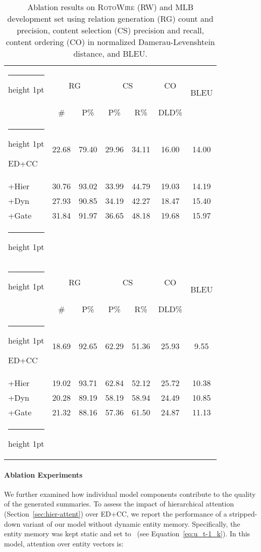 \documentclass[11pt,a4paper]{article}
\makeatletter
\newcommand{\thickhline}{\noalign {\ifnum 0=`}\fi \hrule height 1pt
    \futurelet \reserved@a \@xhline
}
\makeatother
\begin{document}
\begin{table}[t]
\small
\centering
\begin{tabular}{ @{~}l@{~}|@{~}c@{~~}c|c@{~~}c|c|c@{~} } 
 \thickhline
\multirow{2}{*}{\textsc{RW}} &\multicolumn{2}{c|}{RG} &\multicolumn{2}{c|}{CS} & CO & \multirow{2}{*}{BLEU}\\ 

 &\# & P\% & P\% & R\% & DLD\% & \\ 
\thickhline
ED+CC & 22.68 &79.40 & 29.96 & 34.11 & 16.00 & 14.00 \\
+Hier&30.76 &93.02&33.99&44.79&19.03&14.19 \\
+Dyn&27.93 &90.85 &34.19 &42.27 &18.47 &15.40 \\ +Gate&31.84 &91.97 & 36.65 & 48.18 & 19.68 & 15.97 \\
\thickhline
\multicolumn{7}{c}{} \\  \thickhline
\multirow{2}{*}{MLB} &\multicolumn{2}{c|}{RG} &\multicolumn{2}{c|}{CS} & CO & \multirow{2}{*}{BLEU}\\ 
 &\# & P\% & P\% & R\% & DLD\% & \\ 
 \thickhline
ED+CC & 18.69 & 92.65 & 62.29 & 51.36 & 25.93 & 9.55 \\ 
+Hier &19.02 &93.71&62.84&52.12&25.72&10.38 \\
+Dyn&20.28 &89.19 &58.19 &58.94 &24.49 &10.85 \\ +Gate&21.32 & 88.16 & 57.36 & 61.50
 &24.87 & 11.13\\ 


\thickhline
\end{tabular}
\caption{\label{tbl:ablation-entity-memory-mlb}Ablation
  results on \textsc{RotoWire} (RW) and \textsc{MLB} development set using 
  relation generation (RG)  count and precision, content
  selection (CS) precision and recall, content ordering
  (CO) in normalized Damerau-Levenshtein distance,
  and BLEU.}
\end{table}

\paragraph{Ablation Experiments} We further examined how individual
model components contribute to the quality of the generated
summaries. To assess the impact of hierarchical attention
(Section~\ref{sec:hier-attent}) over ED+CC, we report the performance
of a stripped-down variant of our model without dynamic entity memory.
Specifically, the entity memory was kept static and set
to~ (see Equation~\eqref{eq:u_t-1_k}). In this
model, attention over entity vectors is:
\end{document}
